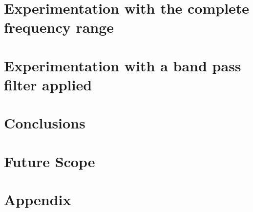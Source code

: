 \documentclass[12pt]{article}
\begin{document}
\section{Experimentation with the complete frequency range}\label{Experiment_1}
\section{Experimentation with a band pass filter applied}\label{Experiment_2}


\section{Conclusions}\label{Conclusions}

\section{Future Scope}\label{Future Scope}

\section{Appendix}\label{Appendix}






\end{document}

